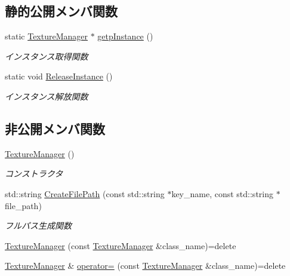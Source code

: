 \subsection*{静的公開メンバ関数}
\begin{DoxyCompactItemize}
\item 
static \mbox{\hyperlink{class_texture_manager}{Texture\+Manager}} $\ast$ \mbox{\hyperlink{class_texture_manager_a476998e9556141f2b5443ee34797c41d}{getp\+Instance}} ()
\begin{DoxyCompactList}\small\item\em インスタンス取得関数 \end{DoxyCompactList}\item 
static void \mbox{\hyperlink{class_texture_manager_ae490a44d40d31bda3297c64b4ce37c51}{Release\+Instance}} ()
\begin{DoxyCompactList}\small\item\em インスタンス解放関数 \end{DoxyCompactList}\end{DoxyCompactItemize}
\subsection*{非公開メンバ関数}
\begin{DoxyCompactItemize}
\item 
\mbox{\hyperlink{class_texture_manager_ad76abb178b37cedf4514eb0154349935}{Texture\+Manager}} ()
\begin{DoxyCompactList}\small\item\em コンストラクタ \end{DoxyCompactList}\item 
std\+::string \mbox{\hyperlink{class_texture_manager_a1686601d7194dc42fdb373d5f76f2af9}{Create\+File\+Path}} (const std\+::string $\ast$key\+\_\+name, const std\+::string $\ast$file\+\_\+path)
\begin{DoxyCompactList}\small\item\em フルパス生成関数 \end{DoxyCompactList}\item 
\mbox{\hyperlink{class_texture_manager_a4ef42214937c5c9e58f87c28a079a858}{Texture\+Manager}} (const \mbox{\hyperlink{class_texture_manager}{Texture\+Manager}} \&class\+\_\+name)=delete
\item 
\mbox{\hyperlink{class_texture_manager}{Texture\+Manager}} \& \mbox{\hyperlink{class_texture_manager_a3f13712c65812a9053852165a9a67824}{operator=}} (const \mbox{\hyperlink{class_texture_manager}{Texture\+Manager}} \&class\+\_\+name)=delete
\end{DoxyCompactItemize}
